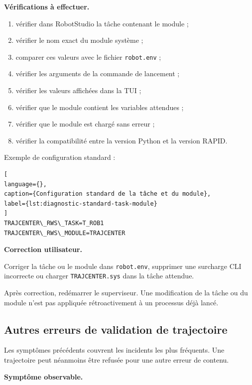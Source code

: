 \documentclass{rapportENSAM}
\begin{document}
\textbf{Vérifications à effectuer.}

\begin{enumerate}
\item vérifier dans RobotStudio la tâche contenant le module ;
\item vérifier le nom exact du module système ;
\item comparer ces valeurs avec le fichier \texttt{robot.env} ;
\item vérifier les arguments de la commande de lancement ;
\item vérifier les valeurs affichées dans la TUI ;
\item vérifier que le module contient les variables attendues ;
\item vérifier que le module est chargé sans erreur ;
\item vérifier la compatibilité entre la version Python et la version
RAPID.
\end{enumerate}

Exemple de configuration standard :

\begin{lstlisting}[
language={},
caption={Configuration standard de la tâche et du module},
label={lst:diagnostic-standard-task-module}
]
TRAJCENTER\_RWS\_TASK=T_ROB1
TRAJCENTER\_RWS\_MODULE=TRAJCENTER
\end{lstlisting}

\textbf{Correction utilisateur.}

Corriger la tâche ou le module dans \texttt{robot.env}, supprimer une surcharge
CLI incorrecte ou charger \texttt{TRAJCENTER.sys} dans la tâche attendue.

Après correction, redémarrer le superviseur. Une modification de la tâche ou du
module n'est pas appliquée rétroactivement à un processus déjà lancé.

\subsection{Autres erreurs de validation de trajectoire}
\label{subsec:diagnostic-validation-errors}

Les symptômes précédents couvrent les incidents les plus fréquents. Une
trajectoire peut néanmoins être refusée pour une autre erreur de contenu.

\textbf{Symptôme observable.}
\end{document}
